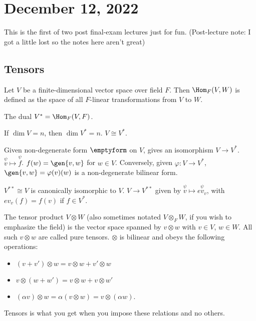 \section{December 12, 2022}

This is the first of two post final-exam lectures just for fun. (Post-lecture note: I got a little lost so the notes here aren't great)

\subsection{Tensors}

Let $V$ be a finite-dimensional vector space over field $F$. Then $\Hom_F(V,W)$ is defined as the space of all $F$-linear transformations from $V$ to $W$. 

\begin{definition}

The \ac{dual} $V^* = \Hom_F(V,F)$.
\end{definition}

If $\dim V=n$, then $\dim V^*=n$. $V\cong V^*$. 

Given non-degenerate form $\emptyform$ on $V$, gives an isomorphism $V\rightarrow V^*$. $\overset{\psi}{v}\mapsto\overset{\psi}{f}$. $f(w) = \gen{v,w}$ for $w\in V$. Conversely, given $\varphi : V\rightarrow V^*$, $\gen{v,w} = \varphi(v)(w)$ is a non-degenerate bilinear form.  

$V^{**}\cong V$ is canonically isomorphic to $V$. $V\rightarrow V^{**}$ given by $\overset{\psi}{v}\mapsto \overset{\psi}{ev_v}$, with $ev_v(f) = f(v)$ if $f\in V^*$.

\begin{definition}

The \ac{tensor product} $V\otimes W$ (also sometimes notated $V\otimes_F W$, if you wish to emphasize the field) is the vector space spanned by $v\otimes w$ with $v\in V$, $w\in W$. All such $v\otimes w$ are called \ac{pure tensors}. $\otimes$ is bilinear and obeys the following operations:
\begin{itemize}
\item $(v+v')\otimes w = v\otimes w + v'\otimes w$
\item $v\otimes (w+w') = v\otimes w + v\otimes w'$
\item $(\alpha v)\otimes w = \alpha (v\otimes w) = v\otimes (\alpha w)$. 
\end{itemize}
\end{definition}
Tensors is what you get when you impose these relations and no others. 


